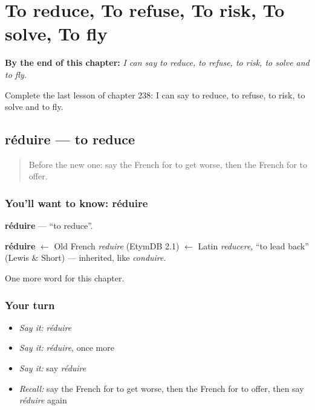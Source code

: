 
\chapter{To reduce, To refuse, To risk, To solve, To fly}
\label{ch:fr-to-reduce-to-refuse-to-risk-to-solve-to-fly}

\begin{chapteropening}
\textbf{By the end of this chapter:} \emph{I can say to reduce, to refuse, to risk, to solve and to fly.}

Complete the last lesson of chapter 238: I can say to reduce, to refuse, to risk, to solve and to fly.
\end{chapteropening}

\section[réduire]{réduire — to reduce}

\label{lesson:FR-C238-reduire}



\begin{quote}
Before the new one: say the French for to get worse, then the French for to offer.
\end{quote}

\subsection*{You'll want to know: réduire}
\textbf{réduire} — \textquotedblleft{}to reduce\textquotedblright{}.

\begin{cousinweb}
\textbf{réduire} $\leftarrow$ Old French \emph{reduire} (EtymDB 2.1) $\leftarrow$ Latin \emph{reducere}, \textquotedblleft{}to lead back\textquotedblright{} (Lewis \& Short) — inherited, like \emph{conduire}.
\end{cousinweb}

\begin{grammarlens}[title={What you've built}]
One more word for this chapter.
\end{grammarlens}

\subsection*{Your turn}
\begin{itemize}
\raggedright
  \item \emph{Say it:} \emph{réduire}
  \item \emph{Say it:} \emph{réduire}, once more
  \item \emph{Say it:} say \emph{réduire}
  \item \emph{Recall:} say the French for to get worse, then the French for to offer, then say \emph{réduire} again
\end{itemize}


